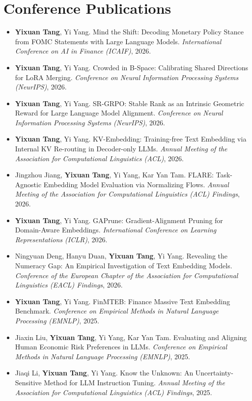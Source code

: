 \documentclass[11pt,a4paper]{article}
\begin{document}
\section*{Conference Publications}
\begin{itemize}[itemsep=3pt]
  \item \textbf{Yixuan Tang}, Yi Yang. Mind the Shift: Decoding Monetary Policy Stance from FOMC Statements with Large Language Models. \textit{International Conference on AI in Finance (ICAIF)}, 2026.
  \item \textbf{Yixuan Tang}, Yi Yang. Crowded in B-Space: Calibrating Shared Directions for LoRA Merging. \textit{Conference on Neural Information Processing Systems (NeurIPS)}, 2026.
  \item \textbf{Yixuan Tang}, Yi Yang. SR-GRPO: Stable Rank as an Intrinsic Geometric Reward for Large Language Model Alignment. \textit{Conference on Neural Information Processing Systems (NeurIPS)}, 2026.
  \item \textbf{Yixuan Tang}, Yi Yang. KV-Embedding: Training-free Text Embedding via Internal KV Re-routing in Decoder-only LLMs. \textit{Annual Meeting of the Association for Computational Linguistics (ACL)}, 2026.
  \item Jingzhou Jiang, \textbf{Yixuan Tang}, Yi Yang, Kar Yan Tam. FLARE: Task-Agnostic Embedding Model Evaluation via Normalizing Flows. \textit{Annual Meeting of the Association for Computational Linguistics (ACL) Findings}, 2026.
  \item \textbf{Yixuan Tang}, Yi Yang. GAPrune: Gradient-Alignment Pruning for Domain-Aware Embeddings. \textit{International Conference on Learning Representations (ICLR)}, 2026.
  \item Ningyuan Deng, Hanyu Duan, \textbf{Yixuan Tang}, Yi Yang. Revealing the Numeracy Gap: An Empirical Investigation of Text Embedding Models. \textit{Conference of the European Chapter of the Association for Computational Linguistics (EACL) Findings}, 2026.
  \item \textbf{Yixuan Tang}, Yi Yang. FinMTEB: Finance Massive Text Embedding Benchmark. \textit{Conference on Empirical Methods in Natural Language Processing (EMNLP)}, 2025.
  \item Jiaxin Liu, \textbf{Yixuan Tang}, Yi Yang, Kar Yan Tam. Evaluating and Aligning Human Economic Risk Preferences in LLMs. \textit{Conference on Empirical Methods in Natural Language Processing (EMNLP)}, 2025.
  \item Jiaqi Li, \textbf{Yixuan Tang}, Yi Yang. Know the Unknown: An Uncertainty-Sensitive Method for LLM Instruction Tuning. \textit{Annual Meeting of the Association for Computational Linguistics (ACL) Findings}, 2025.

\end{itemize}
\end{document}
